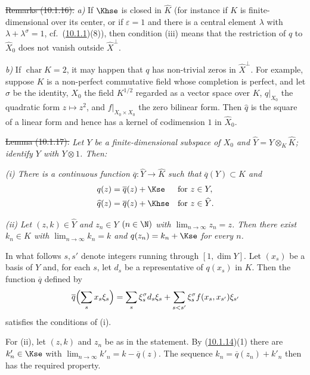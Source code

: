 \documentclass[12pt,a4paper,oneside,english]{smfart}
\newcommand{\btref}[1]{\hyperlink{bt:#1}{#1}}
\theoremstyle{definition}
\theoremstyle{bt}
\begin{document}
\st{Remarks (10.1.16).}
\emph{a)} If $\Khse$ is closed in $\widehat K$ (for instance if $K$ is
finite-dimensional over its center, or if $\varepsilon=1$ and there is a central
element $\lambda$ with $\lambda+\lambda^{\sigma}=1$, cf.\ (\btref{10.1.1})(8)), then
condition (iii) means that the restriction of $q$ to $\widehat X_0$ does not
vanish outside $\widehat X^{\perp}$.

\emph{b)} If $\operatorname{char}K=2$, it may happen that $q$ has non-trivial
zeros in $\widehat X^{\perp}$. For example, suppose $K$ is a non-perfect
commutative field whose completion is perfect, and let $\sigma$ be the identity,
$X_0$ the field $K^{1/2}$ regarded as a vector space over $K$, $q|_{X_0}$ the
quadratic form $z\mapsto z^{2}$, and $f|_{X_0\times X_0}$ the zero bilinear
form. Then $\widehat q$ is the square of a linear form and hence has a kernel of
codimension $1$ in $\widehat X_0$.

\st{Lemma (10.1.17).}
\emph{Let $Y$ be a finite-dimensional subspace of $X_0$ and
$\widehat Y=Y\otimes_K\widehat K$; identify $Y$ with $Y\otimes1$. Then:}

\emph{(i) There is a continuous function $\overline q:\widehat Y\to\widehat K$
such that $\overline q(Y)\subset K$ and}
\begin{align*}
q(z)&=\overline q(z)+\Kse  &&\text{for } z\in Y,\\
\widehat q(z)&=\overline q(z)+\Khse &&\text{for } z\in\widehat Y.
\end{align*}

\emph{(ii) Let $(z,k)\in\widehat Y$ and $z_n\in Y$ $(n\in\N)$ with
$\lim_{n\to\infty}z_n=z$. Then there exist $k_n\in K$ with
$\lim_{n\to\infty}k_n=k$ and $q(z_n)=k_n+\Kse$ for every $n$.}

\pf In what follows $s,s'$ denote integers running through $[1,\dim Y]$. Let
$(x_s)$ be a basis of $Y$ and, for each $s$, let $d_s$ be a representative of
$q(x_s)$ in $K$. Then the function $\overline q$ defined by
\[
\overline q\Bigl(\sum_s x_s\xi_s\Bigr)
 =\sum_s \xi_s^{\sigma}d_s\xi_s+\sum_{s<s'}\xi_s^{\sigma}f(x_s,x_{s'})\xi_{s'}
\]
satisfies the conditions of (i).

For (ii), let $(z,k)$ and $z_n$ be as in the statement. By (\btref{10.1.14})(1) there
are $k'_n\in\Kse$ with $\lim_{n\to\infty}k'_n=k-\overline q(z)$. The sequence
$k_n=\overline q(z_n)+k'_n$ then has the required property.
\end{document}
